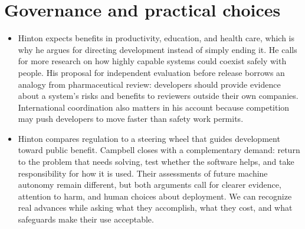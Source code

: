 \documentclass[10pt]{article}
\begin{document}
\section*{Governance and practical choices}

\begin{itemize}[leftmargin=1.25em, itemsep=0.3em, parsep=0pt, topsep=0pt]
    \item Hinton expects benefits in productivity, education, and health care, which is why he argues for directing development instead of simply ending it. He calls for more research on how highly capable systems could coexist safely with people. His proposal for independent evaluation before release borrows an analogy from pharmaceutical review: developers should provide evidence about a system's risks and benefits to reviewers outside their own companies. International coordination also matters in his account because competition may push developers to move faster than safety work permits.

    \item Hinton compares regulation to a steering wheel that guides development toward public benefit. Campbell closes with a complementary demand: return to the problem that needs solving, test whether the software helps, and take responsibility for how it is used. Their assessments of future machine autonomy remain different, but both arguments call for clearer evidence, attention to harm, and human choices about deployment. We can recognize real advances while asking what they accomplish, what they cost, and what safeguards make their use acceptable.
\end{itemize}

\end{document}
